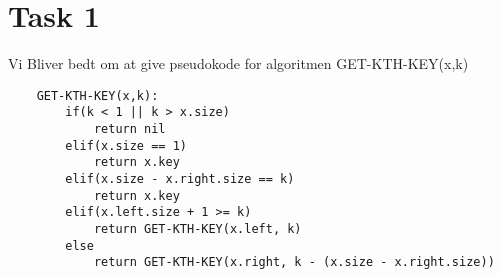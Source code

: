 \section{Task 1}
Vi Bliver bedt om at give pseudokode for algoritmen GET-KTH-KEY(x,k)
\begin{lstlisting}
	GET-KTH-KEY(x,k):
		if(k < 1 || k > x.size)
			return nil
		elif(x.size == 1)
			return x.key
		elif(x.size - x.right.size == k)
			return x.key
		elif(x.left.size + 1 >= k)
			return GET-KTH-KEY(x.left, k)
		else
			return GET-KTH-KEY(x.right, k - (x.size - x.right.size))
\end{lstlisting}

